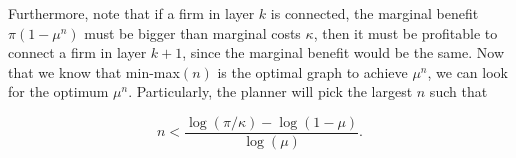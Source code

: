 \documentclass[american, abstract=on]{scrartcl}
\theoremstyle{plain}
\begin{document}
Furthermore, note that if a firm in layer $k$ is connected, the marginal benefit $\pi (1 - \mu^n)$ must be bigger than marginal costs $\kappa$, then it must be profitable to connect a firm in layer $k + 1$, since the marginal benefit would be the same. Now that we know that min-max$(n)$ is the optimal graph to achieve $\mu^n$, we can look for the optimum $\mu^n$. Particularly, the planner will pick the largest $n$ such that

\begin{equation}
  n < \frac{\log(\pi / \kappa) - \log(1 - \mu)}{\log(\mu)}.
\end{equation}

\newpage
\nocite{*}

\newpage
\appendix

\end{document}

